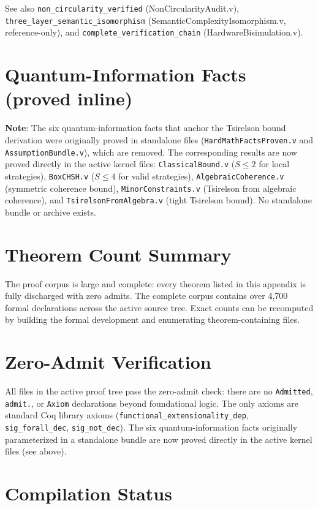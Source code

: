See also \texttt{non\_circularity\_verified} (NonCircularityAudit.v), \texttt{three\_layer\_semantic\_isomorphism} (SemanticComplexityIsomorphism.v, reference-only), and \texttt{complete\_verification\_chain} (HardwareBisimulation.v).

\section{Quantum-Information Facts (proved inline)}

\textbf{Note}: The six quantum-information facts that anchor the Tsirelson bound derivation were originally proved in standalone files (\texttt{HardMathFactsProven.v} and \texttt{AssumptionBundle.v}), which are removed. The corresponding results are now proved directly in the active kernel files: \texttt{ClassicalBound.v} ($S \leq 2$ for local strategies), \texttt{BoxCHSH.v} ($S \leq 4$ for valid strategies), \texttt{AlgebraicCoherence.v} (symmetric coherence bound), \texttt{MinorConstraints.v} (Tsirelson from algebraic coherence), and \texttt{TsirelsonFromAlgebra.v} (tight Tsirelson bound). No standalone bundle or archive exists.

\section{Theorem Count Summary}

The proof corpus is large and complete: every theorem listed in this appendix is fully discharged with zero admits. The complete corpus contains over 4,700 formal declarations across the active source tree. Exact counts can be recomputed by building the formal development and enumerating theorem-containing files.

\section{Zero-Admit Verification}

All files in the active proof tree pass the zero-admit check: there are no \texttt{Admitted}, \texttt{admit.}, or \texttt{Axiom} declarations beyond foundational logic. The only axioms are standard Coq library axioms (\texttt{functional\_extensionality\_dep}, \texttt{sig\_forall\_dec}, \texttt{sig\_not\_dec}). The six quantum-information facts originally parameterized in a standalone bundle are now proved directly in the active kernel files (see above).

\section{Compilation Status}

